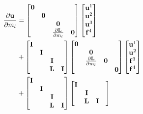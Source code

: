 \documentclass[revised,endfloat]{geophysics}
\begin{document}
\begin{equation}
\begin{split}
\frac{\partial {\bf u}}{\partial m_l} &=\begin{bmatrix}
{\bf 0} & & & \\
 & {\bf 0} & & \\
 & &  {\bf 0}& \\
 & & \frac{\partial {\bf L}}{\partial m_l}& {\bf 0} \\
\end{bmatrix}
\begin{bmatrix}
{\bf u}^1 \\
{\bf u}^2 \\
{\bf u}^3 \\
{\bf f}^4 \\
\end{bmatrix}                  \\
&+ \begin{bmatrix}
{\bf I} & & & \\
 & {\bf I} & & \\
 & &  {\bf I}& \\
 & & {\bf L}& {\bf I} \\
\end {bmatrix}
\begin{bmatrix}
{\bf 0} & & & \\
 & {\bf 0} & & \\
 & \frac{\partial {\bf L}}{\partial m_l} & {\bf 0}& \\
 & & & {\bf 0} \\
\end {bmatrix}
\begin{bmatrix}
{\bf u}^1 \\
{\bf u}^2 \\
{\bf f}^3 \\
{\bf f}^4 \\
\end{bmatrix}                 \\
&+ \begin{bmatrix}
{\bf I} & & & \\
 & {\bf I} & & \\
 & &  {\bf I}& \\
 & & {\bf L}& {\bf I} \\
\end {bmatrix}
\begin{bmatrix}
{\bf I} & & & \\
 & {\bf I} & & \\
 & {\bf L} &  {\bf I}& \\

\end{bmatrix}
\end{split}
\end{equation}
\end{document}
